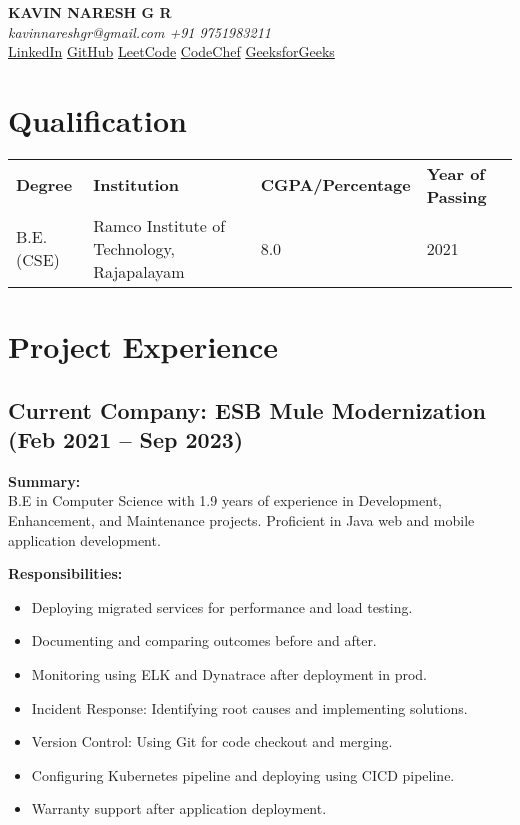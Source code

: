 \documentclass[letterpaper,10pt]{article}
\begin{document}
\pagestyle{empty} %

\begin{center}
\textbf{\LARGE KAVIN NARESH G R} \\
\textit{kavinnareshgr@gmail.com \quad +91 9751983211} \\
\href{https://www.linkedin.com/in/kavin-naresh-g-r/}{LinkedIn} \quad \href{https://github.com/kavin-naresh}{GitHub} \quad \href{https://leetcode.com/kavinnareshgr/}{LeetCode} \quad \href{https://www.codechef.com/users/kavinnaresh/}{CodeChef} \quad \href{https://auth.geeksforgeeks.org/user/kavinnan6sj}{GeeksforGeeks}
\end{center}

\section*{Qualification}
\begin{tabular}{l l l l}
\textbf{Degree} & \textbf{Institution} & \textbf{CGPA/Percentage} & \textbf{Year of Passing} \\
B.E.(CSE) & Ramco Institute of Technology, Rajapalayam & 8.0 & 2021 \\
\end{tabular}

\section*{Project Experience}

\subsection*{Current Company: ESB Mule Modernization (Feb 2021 -- Sep 2023)}
\textbf{Summary:} \\
B.E in Computer Science with 1.9 years of experience in Development, Enhancement, and Maintenance projects. Proficient in Java web and mobile application development.

\textbf{Responsibilities:}
\begin{itemize}[left=0pt, label={}]
    \item Deploying migrated services for performance and load testing.
    \item Documenting and comparing outcomes before and after.
    \item Monitoring using ELK and Dynatrace after deployment in prod.
    \item Incident Response: Identifying root causes and implementing solutions.
    \item Version Control: Using Git for code checkout and merging.
    \item Configuring Kubernetes pipeline and deploying using CICD pipeline.
    \item Warranty support after application deployment.
\end{itemize}
\end{document}
